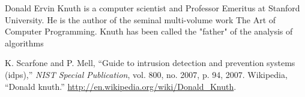 \documentclass{fisatproject}
\begin{document}
Donald Ervin Knuth \cite{knuth} is a computer scientist and Professor Emeritus at Stanford University. He is the author of the seminal multi-volume work The Art of Computer Programming. Knuth has been called the "father" of the analysis of algorithms


\begin{thebibliography}{1}
 K. Scarfone and P. Mell, ``Guide to intrusion detection and prevention systems
(idps),'' \textit{NIST Special Publication}, vol. 800, no. 2007, p. 94, 2007.
 Wikipedia, ``Donald knuth.'' \url{http://en.wikipedia.org/wiki/Donald_Knuth}.


\end{thebibliography}
\end{document}
